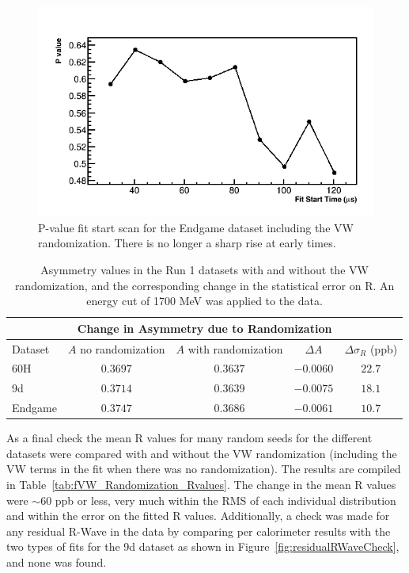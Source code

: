 \documentclass[12pt,letterpaper]{article}
\newcommand{\figref}[1]{Figure~\ref{#1}}
\begin{document}
\begin{figure}[]
    \centering
    \includegraphics[width=.7\textwidth]{Pvalue_Endgame_withRand}
    \caption[]{P-value fit start scan for the Endgame dataset including the VW randomization. There is no longer a sharp rise at early times.}
    \label{fig:Pval_Endgame_withVWRand}
\end{figure}



\begin{table}[]
\centering
\small
\setlength\tabcolsep{10pt}
\renewcommand{\arraystretch}{1.2}
\begin{tabular*}{1\linewidth}{@{\extracolsep{\fill}}lcccc}
  \hline
    \multicolumn{5}{c}{\textbf{Change in Asymmetry due to Randomization}} \\
  \hline\hline
    Dataset & $A$ no randomization & $A$ with randomization & $\Delta A$ & $\Delta \sigma_{R}$ (ppb) \\
  \hline
    60H & $0.3697$ & $0.3637$ & $-0.0060$ & $22.7$ \\
  \hline
    9d & $0.3714$ & $0.3639$ & $-0.0075$ & $18.1$ \\
  \hline
    Endgame & $0.3747$ & $0.3686$ & $-0.0061$ & $10.7$ \\
  \hline
\end{tabular*}
\caption[]{Asymmetry values in the Run 1 datasets with and without the VW randomization, and the corresponding change in the statistical error on R. An energy cut of 1700 MeV was applied to the data.}
\label{tab:A_change}
\end{table}


As a final check the mean R values for many random seeds for the different datasets were compared with and without the VW randomization (including the VW terms in the fit when there was no randomization). The results are compiled in Table~\ref{tab:fVW_Randomization_Rvalues}. The change in the mean R values were $\sim$60 ppb or less, very much within the RMS of each individual distribution and within the error on the fitted R values. Additionally, a check was made for any residual R-Wave in the data by comparing per calorimeter results with the two types of fits for the 9d dataset as shown in \figref{fig:residualRWaveCheck}, and none was found.
\end{document}
